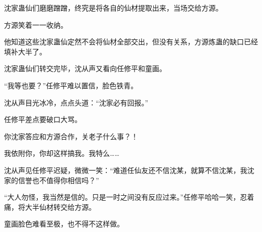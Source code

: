 \begin{this_body}
沈家蛊仙们磨磨蹭蹭，终究是将各自的仙材提取出来，当场交给方源。

方源笑着一一收纳。

他知道这些沈家蛊仙定然不会将仙材全部交出，但没有关系，方源炼蛊的缺口已经填补大半了。

沈家蛊仙们转交完毕，沈从声又看向任修平和童画。

“我等也要？”任修平难以置信，脸色铁青。

沈从声目光冰冷，点点头道：“沈家必有回报。”

任修平差点要破口大骂。

你沈家答应和方源合作，关老子什么事？！

我依附你，你却这样搞我。我特么……

沈从声见任修平迟疑，微微一笑：“难道任仙友还不信沈某，就算不信沈某，我沈家的信誉也不值得你相信吗？”

“大人勿怪，我当然是信的。只是一时之间没有反应过来。”任修平哈哈一笑，忍着痛，将大半仙材转交给方源。

童画脸色难看至极，也不得不这样做。

\end{this_body}

